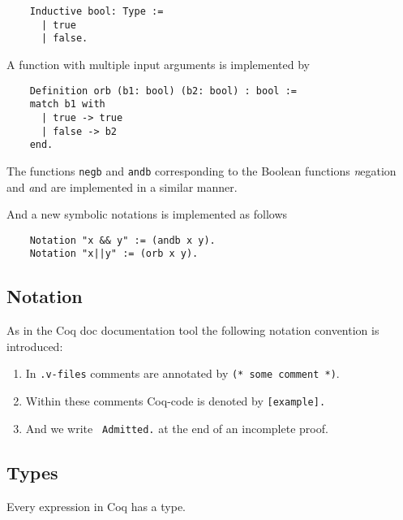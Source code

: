     \label{Def:booleans}
    \begin{lstlisting}    
    Inductive bool: Type :=
      | true
      | false.
    \end{lstlisting}
    
    A function with multiple input arguments is implemented by
    \begin{lstlisting}
    Definition orb (b1: bool) (b2: bool) : bool :=
    match b1 with
	  | true -> true
	  | false -> b2
    end.
    \end{lstlisting}
    
    The functions \lstinline!negb! and \lstinline!andb! corresponding to the Boolean functions {\emph negation} and {\emph and} are implemented in a similar manner.
     
    And a new symbolic notations is implemented as follows
    \begin{lstlisting}
    Notation "x && y" := (andb x y).
    Notation "x||y" := (orb x y).
    \end{lstlisting}
    
     
\subsection{Notation}
    As in the Coq doc documentation tool the following notation convention is introduced:
     
    \begin{enumerate}
     \item In \texttt{.v-files} comments are annotated by \lstinline!(* some comment *)!. 
     \item Within these comments Coq-code is denoted by \lstinline![example].! 
     \item And we write \lstinline! Admitted.! at the end of an incomplete proof.    
     \end{enumerate}
     
     
\subsection{Types}
     Every expression in Coq has a type.
   
